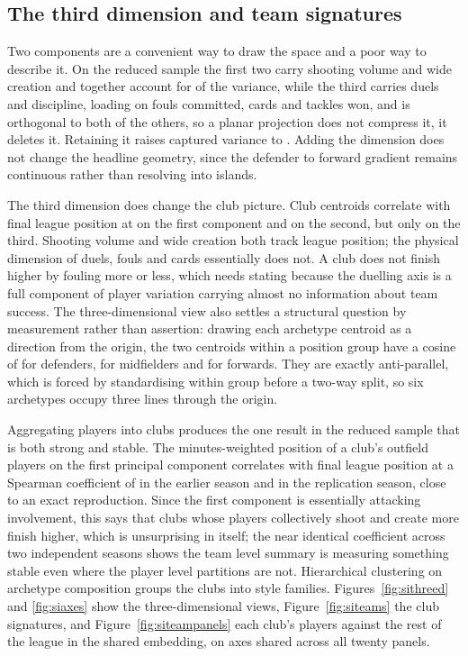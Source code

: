 \subsection{The third dimension and team signatures}
\label{sec:si:threed}

Two components are a convenient way to draw the space and a poor way to describe it. On the
reduced sample the first two carry shooting volume and wide creation and together account for
\ThreeDVarTwo{} of the variance, while the third carries duels and discipline, loading on fouls
committed, cards and tackles won, and is orthogonal to both of the others, so a planar
projection does not compress it, it deletes it. Retaining it raises captured variance to
\ThreeDVarThree{}. Adding the dimension does not change the headline geometry, since the
defender to forward gradient remains continuous rather than resolving into islands.

The third dimension does change the club picture. Club centroids correlate with final league
position at \ThreeDTeamPCOne{} on the first component and \ThreeDTeamPCTwo{} on the second, but
only \ThreeDTeamPCThree{} on the third. Shooting volume and wide creation both track league
position; the physical dimension of duels, fouls and cards essentially does not. A club does not
finish higher by fouling more or less, which needs stating because the duelling axis is a full
component of player variation carrying almost no information about team success. The
three-dimensional view also settles a structural question by measurement rather than assertion:
drawing each archetype centroid as a direction from the origin, the two centroids within a
position group have a cosine of \CosineDF{} for defenders, \CosineMF{} for midfielders and
\CosineFW{} for forwards. They are exactly anti-parallel, which is forced by standardising
within group before a two-way split, so six archetypes occupy three lines through the origin.

Aggregating players into clubs produces the one result in the reduced sample that is both strong
and stable. The minutes-weighted position of a club's outfield players on the first principal
component correlates with final league position at a Spearman coefficient of \TeamPCOneRho{} in
the earlier season and \TeamPCOneRhoRepl{} in the replication season, close to an exact
reproduction. Since the first component is essentially attacking involvement, this says that
clubs whose players collectively shoot and create more finish higher, which is unsurprising in
itself; the near identical coefficient across two independent seasons shows the team level
summary is measuring something stable even where the player level partitions are not.
Hierarchical clustering on archetype composition groups the \NTeams{} clubs into
\NStyleGroups{} style families. Figures~\ref{fig:sithreed} and \ref{fig:siaxes} show the
three-dimensional views, Figure~\ref{fig:siteams} the club signatures, and
Figure~\ref{fig:siteampanels} each club's players against the rest of the league in the shared
embedding, on axes shared across all twenty panels.

